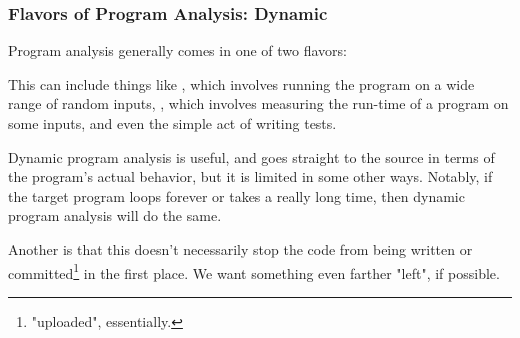 \documentclass[aspectratio=169, handout]{beamer}
\begin{document}
\begin{frame}[fragile]
  \frametitle{Flavors of Program Analysis: Dynamic}

  Program analysis generally comes in one of two flavors:

  \pause
  \vspace{\fill}


  \pause
  \vspace{\fill}

  This can include things like , which involves running
  the program on a wide range of random inputs, , which
  involves measuring the run-time of a program on some inputs, and even
  the simple act of writing tests.

  \pause
  \vspace{\fill}

  Dynamic program analysis is useful, and goes straight to the source in terms
  of the program's actual behavior, but it is limited in some other ways.
  Notably, if the target program loops forever or takes a really long time, then
  dynamic program analysis will do the same.

  \pause
  \vspace{\fill}

  Another is that this doesn't necessarily stop the code from being written or
  committed\footnote{"uploaded", essentially.} in the first place. We want something
  even farther "left", if possible.

\end{frame}
\end{document}
